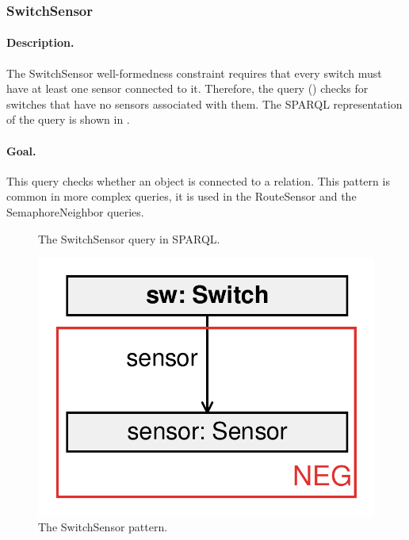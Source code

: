 \subsubsection{SwitchSensor}

\paragraph{Description.} The \textsf{SwitchSensor} well-formedness constraint requires that every switch must have at least one sensor connected to it. Therefore, the query () checks for switches that have no sensors associated with them. The SPARQL representation of the query is shown in .

\paragraph{Goal.} This query checks whether an object is connected to a relation. This pattern is common in more complex queries, \eg it is used in the \textsf{RouteSensor} and the \textsf{SemaphoreNeighbor} queries.

\begin{figure}[htb]
\centering
\begin{minipage}{0.6\textwidth}
  { \alignListing
    }
  \caption{The \textsf{SwitchSensor} query in SPARQL.}
  \label{lst:switchsensor-sparql}
\end{minipage}
\end{figure}


\begin{figure}[htb]
	\centering
	\includegraphics[scale=0.4]{figures/pattern-switchsensor}
	\caption{The \textsf{SwitchSensor} pattern.}
	\label{fig:pattern-switchsensor}
\end{figure}

